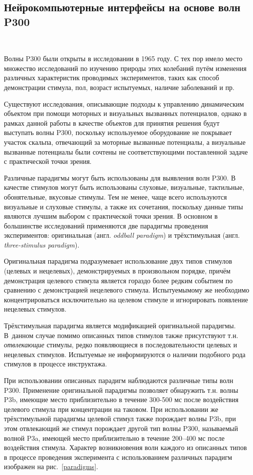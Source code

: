 \documentclass[12pt,a4paper,oneside,fleqn,leqno]{article}
\newcounter{pe} %
\newcommand*{\Nep}{\addtocounter{pe}{1}{\arabic{pe}$^{\circ}$.\;}}
\newcommand*{\NepS}{\mbox{} \\ \Nep}
\begin{document}
	\subsection{Нейрокомпьютерные интерфейсы на основе волн P300}
	\setcounter{pe}{0}
	\NepS {\bf Вызванные потенциалы и волны P300}
	\par Волны P300 были открыты в исследовании \cite{P300_first} в 1965 году. С тех пор имело место множество исследований по изучению природы этих колебаний путём изменения различных характеристик проводимых экспериментов, таких как способ демонстрации стимула, пол, возраст испытуемых, наличие заболеваний  и пр.
	\par Существуют исследования, описывающие подходы к управлению динамическим объектом при помощи моторных и визуальных вызванных потенциалов, однако в рамках данной работы в качестве объектов для принятия решения будут выступать волны P300, поскольку используемое оборудование не покрывает участок скальпа, отвечающий за моторные вызванные потенциалы, а визуальные вызванные потенциалы были сочтены не соответствующими поставленной задаче с практической точки зрения.
	\par Различные парадигмы могут быть использованы для выявления волн P300. В качестве стимулов могут быть использованы слуховые, визуальные, тактильные, обонятельные, вкусовые стимулы. Тем не менее, чаще всего используются визуальные и слуховые стимулы, а также их сочетания, поскольку данные типы являются лучшим выбором с практической точки зрения. В основном в большинстве исследований применяются две парадигмы проведения экспериментов: оригинальная (англ. {\it oddball paradigm}) и трёхстимульная (англ. {\it three-stimulus paradigm}).
	\par Оригинальная парадигма подразумевает использование двух типов стимулов (целевых и нецелевых), демонстрируемых в произвольном порядке, причём демонстрация целевого стимула является гораздо более редким событием по сравнению с демонстрацией нецелевого стимула. Испытуемымому же необходимо концентрироваться исключительно на целевом стимуле и игнорировать появление нецелевых стимулов.
	\par Трёхстимульная парадигма является модификацией оригинальной парадигмы. В~данном случае помимо описанных типов стимулов также присутствуют т.н. {\it отвлекающие} стимулы, редко появляющиеся в последовательности целевых и нецелевых стимулов. Испытуемые не информируются о наличии подобного рода стимулов в процессе инструктажа.
	\par При использовании описанных парадигм наблюдаются различные типы волн P300. Применение оригинальной парадигмы позволяет обнаружить т.н. волны P3b, имеющие место приблизительно в течение 300-500 мс после воздействия целевого стимула при концентрации на таковом. При использовании же трёхстимульной парадигмы целевой стимул также порождает волны P3b, при этом отвлекающий же стимул порождает другой тип волны P300, называемый волной P3a, имеющей место приблизительно в течение 200--400 мс после воздействия стимула. Характер возникновения волн каждого из описанных типов в процессе проведения эксперимента с использованием различных парадигм изображен на рис.~\ref{paradigms}.
\newline
\end{document}
